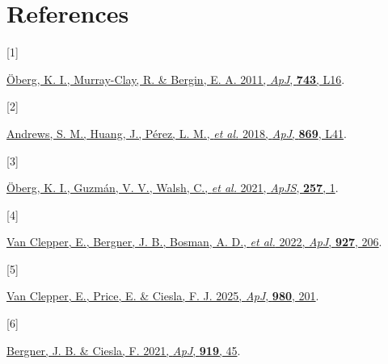 \documentclass[11pt]{article}
\newlength{\cslhangindent}
\newenvironment{CSLReferences}[2]
  {\setlength{\parindent}{0pt}%
   \setlength{\leftskip}{0pt}%
   \setlength{\parskip}{0pt}%
  }
  {}
\newcommand{\CSLLeftMargin}[1]{\parbox[t]{\cslhangindent}{#1}}
\newcommand{\CSLRightInline}[1]{#1}
\let\Oldsection\section
\renewcommand{\section}{\FloatBarrier\Oldsection}
\begin{document}
\hypertarget{references}{%
\section*{References}\label{references}}

\hypertarget{refs}{}
\begin{CSLReferences}{0}{0}
\leavevmode{}%
\CSLLeftMargin{{[}1{]} }%
\CSLRightInline{\href{https://doi.org/10.1088/2041-8205/743/1/L16}{Öberg,
K. I., Murray-Clay, R. \& Bergin, E. A. 2011, \emph{ApJ}, \textbf{743},
L16}.}
\leavevmode{}%
\CSLLeftMargin{{[}2{]} }%
\CSLRightInline{\href{https://doi.org/10.3847/2041-8213/aaf741}{Andrews,
S. M., Huang, J., Pérez, L. M., \emph{et al.} 2018, \emph{ApJ},
\textbf{869}, L41}.}
\leavevmode{}%
\CSLLeftMargin{{[}3{]} }%
\CSLRightInline{\href{https://doi.org/10.3847/1538-4365/ac1432}{Öberg,
K. I., Guzmán, V. V., Walsh, C., \emph{et al.} 2021, \emph{ApJS},
\textbf{257}, 1}.}
\leavevmode{}%
\CSLLeftMargin{{[}4{]} }%
\CSLRightInline{\href{https://doi.org/10.3847/1538-4357/ac511b}{Van
Clepper, E., Bergner, J. B., Bosman, A. D., \emph{et al.} 2022,
\emph{ApJ}, \textbf{927}, 206}.}
\leavevmode{}%
\CSLLeftMargin{{[}5{]} }%
\CSLRightInline{\href{https://doi.org/10.3847/1538-4357/ada8a4}{Van
Clepper, E., Price, E. \& Ciesla, F. J. 2025, \emph{ApJ}, \textbf{980},
201}.}
\leavevmode{}%
\CSLLeftMargin{{[}6{]} }%
\CSLRightInline{\href{https://doi.org/10.3847/1538-4357/ac0fd7}{Bergner,
J. B. \& Ciesla, F. 2021, \emph{ApJ}, \textbf{919}, 45}.}

\end{CSLReferences}
\end{document}
